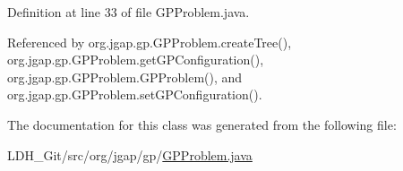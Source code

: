 Definition at line 33 of file G\-P\-Problem.\-java.



Referenced by org.\-jgap.\-gp.\-G\-P\-Problem.\-create\-Tree(), org.\-jgap.\-gp.\-G\-P\-Problem.\-get\-G\-P\-Configuration(), org.\-jgap.\-gp.\-G\-P\-Problem.\-G\-P\-Problem(), and org.\-jgap.\-gp.\-G\-P\-Problem.\-set\-G\-P\-Configuration().



The documentation for this class was generated from the following file\-:\begin{DoxyCompactItemize}
\item 
L\-D\-H\-\_\-\-Git/src/org/jgap/gp/\hyperlink{_g_p_problem_8java}{G\-P\-Problem.\-java}\end{DoxyCompactItemize}
